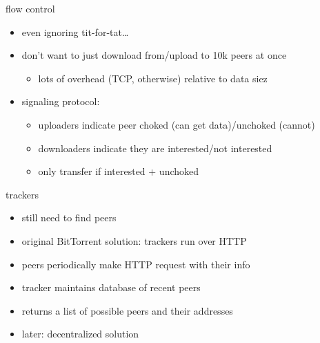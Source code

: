 \begin{frame}{flow control}
    \begin{itemize}
    \item even ignoring tit-for-tat\ldots
    \vspace{.5cm}
    \item don't want to just download from/upload to 10k peers at once
        \begin{itemize}
        \item lots of overhead (TCP, otherwise) relative to data siez
        \end{itemize}
    \item signaling protocol:
        \begin{itemize}
        \item uploaders indicate peer choked (can get data)/unchoked  (cannot)
        \item downloaders indicate they are interested/not interested
        \item only transfer if interested + unchoked
        \end{itemize}
    \end{itemize}
\end{frame}

\begin{frame}{trackers}
    \begin{itemize}
    \item still need to find peers
    \vspace{.5cm}
    \item original BitTorrent solution: trackers run over HTTP
    \item peers periodically make HTTP request with their info
    \item tracker maintains database of recent peers
    \item returns a list of possible peers and their addresses
    \vspace{.5cm}
    \item later: decentralized solution
    \end{itemize}
\end{frame}
